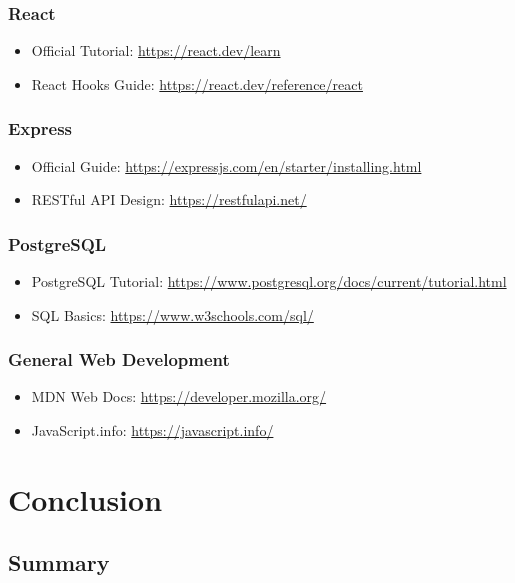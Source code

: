 \documentclass[12pt,a4paper]{article}
\begin{document}
\subsubsection{React}
\begin{itemize}
    \item Official Tutorial: \url{https://react.dev/learn}
    \item React Hooks Guide: \url{https://react.dev/reference/react}
\end{itemize}

\subsubsection{Express}
\begin{itemize}
    \item Official Guide: \url{https://expressjs.com/en/starter/installing.html}
    \item RESTful API Design: \url{https://restfulapi.net/}
\end{itemize}

\subsubsection{PostgreSQL}
\begin{itemize}
    \item PostgreSQL Tutorial: \url{https://www.postgresql.org/docs/current/tutorial.html}
    \item SQL Basics: \url{https://www.w3schools.com/sql/}
\end{itemize}

\subsubsection{General Web Development}
\begin{itemize}
    \item MDN Web Docs: \url{https://developer.mozilla.org/}
    \item JavaScript.info: \url{https://javascript.info/}
\end{itemize}

\section{Conclusion}

\subsection{Summary}
\end{document}
